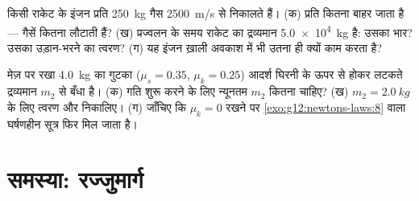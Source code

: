 \begin{exercise}[$\star\star\star$]\label{exo:g12:newtons-laws:14}
किसी राकेट के इंजन प्रति  \qty{250}{kg} गैस \qty{2500}{m/s} से निकालते हैं। (क) प्रति
 कितना  बाहर जाता है --- गैसें कितना  लौटाती
हैं? (ख) प्रज्वलन के समय राकेट का द्रव्यमान \qty{5.0e4}{kg} है: उसका भार?
उसका उड़ान-भरने का त्वरण? (ग) यह इंजन ख़ाली अवकाश में भी उतना ही क्यों
काम करता है?
\end{exercise}

\begin{exercise}[$\star\star\star$]\label{exo:g12:newtons-laws:15}
मेज़ पर रखा \qty{4.0}{kg} का गुटका ($\mu_s = 0.35$, $\mu_k = 0.25$) आदर्श घिरनी के ऊपर से होकर
लटकते द्रव्यमान $m_2$ से बँधा है। (क) गति शुरू करने के लिए न्यूनतम $m_2$
कितना चाहिए? (ख) $m_2 = \qty{2.0}{kg}$ के लिए त्वरण और  निकालिए। (ग) जाँचिए कि
$\mu_k = 0$ रखने पर \cref{exo:g12:newtons-laws:8} वाला घर्षणहीन सूत्र फिर मिल जाता है।
\end{exercise}

\section{समस्या: रज्जुमार्ग}

